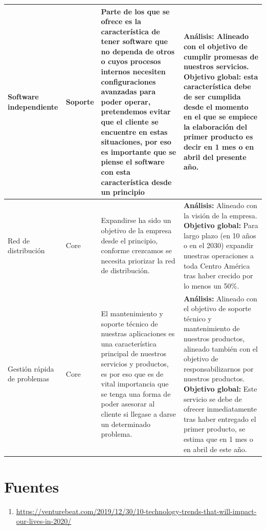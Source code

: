 \documentclass{article}
\begin{document}
\begin{center}
\begin{supertabular}{ |p{2cm}|p{2cm}|p{5cm}|p{5cm}| }
        \hline
            Software independiente & 
            Soporte & 
            Parte de los que se ofrece es la característica de tener software que no dependa de otros o cuyos procesos internos necesiten configuraciones avanzadas para poder operar, pretendemos evitar que el cliente se encuentre en estas situaciones, por eso es importante que se piense el software con esta característica desde un principio & 
            \textbf{Análisis:} Alineado con el objetivo de cumplir promesas de nuestros servicios. \textbf{Objetivo global:} esta característica debe de ser cumplida desde el momento en el que se empiece la elaboración del primer producto es decir en 1 mes o en abril del presente año. \\ 
        \hline
            Red de distribución & 
            Core & 
            Expandirse ha sido un objetivo de la empresa desde el principio, conforme crezcamos se necesita priorizar la red de distribución.  & 
            \textbf{Análisis:} Alineado con la visión de la empresa. \textbf{Objetivo global:} Para largo plazo (en 10 años o en el 2030) expandir nuestras operaciones a toda Centro América tras haber crecido por lo menos un 50\%. \\ 
        \hline 
            Gestión rápida de problemas & 
            Core & 
            El mantenimiento y soporte técnico de nuestras aplicaciones es una característica principal de nuestros servicios y productos, es por eso que es de vital importancia que se tenga una forma de poder asesorar al cliente si llegase a darse un determinado problema. & 
            \textbf{Análisis:} Alineado con el objetivo de soporte técnico y mantenimiento de nuestros productos, alineado también con el objetivo de responsabilizarnos por nuestros productos. \textbf{Objetivo global:} Este servicio se debe de ofrecer inmediatamente tras haber entregado el primer producto, se estima que en 1 mes o en abril de este año. \\ 
        \hline
    \end{supertabular}
\end{center}


\section{Fuentes}
\begin{enumerate}
    \item \url{https://venturebeat.com/2019/12/30/10-technology-trends-that-will-impact-our-lives-in-2020/}
\end{enumerate}
\end{document}
